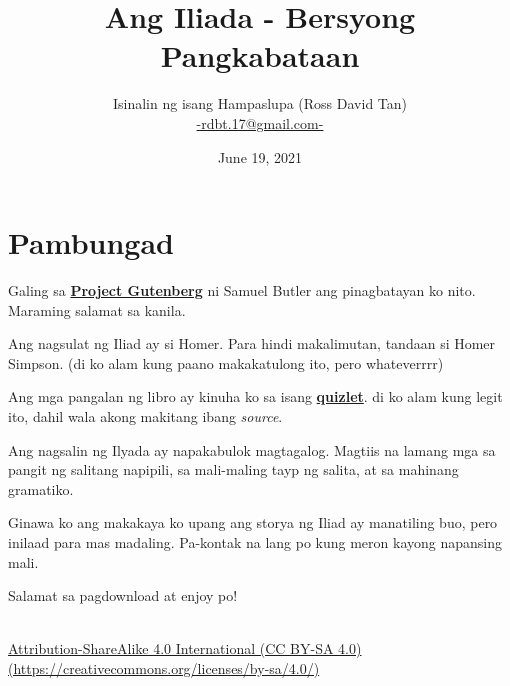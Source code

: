 \documentclass[12pt,letterpaper]{report}
\begin{document}
\title{\textbf{Ang Iliada - Bersyong Pangkabataan}}
\author{Isinalin ng isang Hampaslupa (Ross David Tan) \\ \href{mailto:rdbt.17@gmail.com}{-rdbt.17@gmail.com-}}
\date{June 19, 2021}
\maketitle

\tableofcontents
\pagebreak

\setlength{\parskip}{1em}

\chapter*{Pambungad}
\begin{center}

    Galing sa \href{https://www.gutenberg.org/}{\textbf{Project Gutenberg}} ni Samuel Butler ang pinagbatayan ko nito. Maraming salamat sa kanila.

    Ang nagsulat ng Iliad ay si Homer. Para hindi makalimutan, tandaan si Homer Simpson. (di ko alam kung paano makakatulong ito, pero whateverrrr)

    Ang mga pangalan ng libro ay kinuha ko sa isang \href{https://quizlet.com/24340225/titles-of-each-book-in-the-iliad-flash-cards/}{\textbf{quizlet}}.     di ko alam kung legit ito, dahil wala akong makitang ibang \textit{source}.

    Ang nagsalin ng Ilyada ay napakabulok magtagalog. Magtiis na lamang mga sa pangit ng salitang napipili, sa mali-maling tayp ng salita, at sa mahinang gramatiko.

    Ginawa ko ang makakaya ko upang ang storya ng Iliad ay manatiling buo, pero inilaad para mas madaling. Pa-kontak na lang po kung meron kayong napansing mali.

    Salamat sa pagdownload at enjoy po!
    \vspace*{\fill}
\end{center}
\pagebreak

\vspace*{\fill}
\begin{center}
    \href{https://creativecommons.org/licenses/by-sa/4.0/}{\ccbysa \\[0.5cm] Attribution-ShareAlike 4.0 International (CC BY-SA 4.0) \\ (https://creativecommons.org/licenses/by-sa/4.0/)}
    
\end{center}
\vspace*{\fill}
\end{document}
